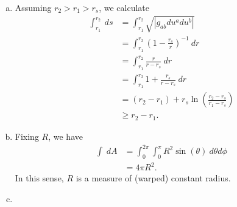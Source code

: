\documentclass[10pt]{mypackage}
\begin{document}
\begin{solution}[30.22]\hfill
  \begin{enumerate}[(a)]
    \item Assuming $r_2 > r_1 > r_s$, we calculate
      \begin{align*}
        \int_{r_1}^{r_2} \:ds &= \int_{r_1}^{r_2}\sqrt{\left\vert g_{ab}du^{a}du^{b} \right\vert}\\
                              &= \int_{r_1}^{r_2} \left( 1-\frac{r_s}{r} \right)^{-1}\:dr\\
                              &= \int_{r_1}^{r_2} \frac{r}{r-r_s}\:dr\\
                              &= \int_{r_1}^{r_2} 1 + \frac{r_s}{r-r_s}\:dr\\
                              &= \left( r_2-r_1 \right) + r_s\ln\left( \frac{r_2-r_s}{r_1-r_s} \right)\\
                              &\geq r_2-r_1.
      \end{align*}
    \item Fixing $R$, we have
      \begin{align*}
        \int_{}^{} \:dA &= \int_{0}^{2\pi}\int_{0}^{\pi}R^2\sin\left( \theta \right)\:d\theta d\phi\\
                        &= 4\pi R^2.
      \end{align*}
      In this sense, $R$ is a measure of (warped) constant radius.
    \item 
  \end{enumerate}
\end{solution}
\begin{solution}[30.28]

\end{solution}
\end{document}
